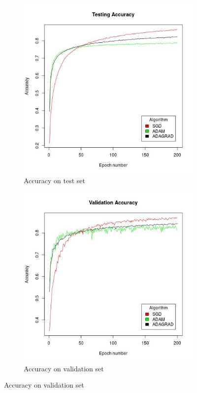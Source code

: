 \documentclass[12pt,twoside]{article}
\theoremstyle{plain}
\theoremstyle{definition}
\theoremstyle{remark}
\begin{document}
\begin{figure}[H]
  \centering
  \begin{subfigure}{.5\textwidth}
    \centering
    \includegraphics[scale=.45]{Code/acc.jpg}
    \caption{Accuracy on test set}
    \label{fig:acc}
  \end{subfigure}%
  \begin{subfigure}{.5\textwidth}
    \centering
    \includegraphics[scale=.45]{Code/val_acc.jpg}
    \caption{Accuracy on validation set}
    \label{fig:acc_val}
  \end{subfigure}%
\end{figure}
\end{document}
